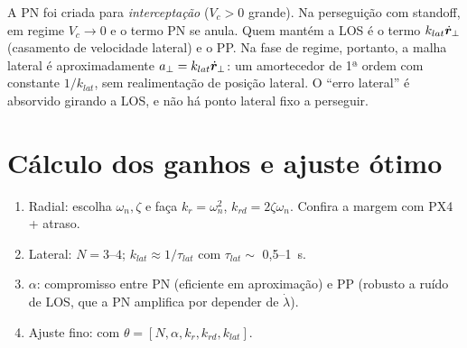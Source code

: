 \begin{atencao}
A PN foi criada para \emph{interceptação} ($V_c>0$ grande). Na perseguição com standoff,
em regime $V_c\to0$ e o termo PN se anula. Quem mantém a LOS é o termo $k_{lat}\dot{\bm{r}}_\perp$
(casamento de velocidade lateral) e o PP. Na fase de regime, portanto, a malha lateral
é aproximadamente $a_\perp=k_{lat}\dot{\bm{r}}_\perp$: um amortecedor de 1ª ordem com
constante $1/k_{lat}$, sem realimentação de posição lateral. O ``erro lateral'' é
absorvido girando a LOS, e não há ponto lateral fixo a perseguir.
\end{atencao}

\section{Cálculo dos ganhos e ajuste ótimo}
\begin{enumerate}
  \item Radial: escolha $\omega_n,\zeta$ e faça $k_r=\omega_n^2$, $k_{rd}=2\zeta\omega_n$.
        Confira a margem com PX4 + atraso.
  \item Lateral: $N=3$--$4$; $k_{lat}\approx1/\tau_{lat}$ com $\tau_{lat}\sim$ 0,5--\SI{1}{s}.
  \item $\alpha$: compromisso entre PN (eficiente em aproximação) e PP (robusto a ruído
        de LOS, que a PN amplifica por depender de $\dot\lambda$).
  \item Ajuste fino:  com $\theta=[N,\alpha,k_r,k_{rd},k_{lat}]$.
\end{enumerate}
